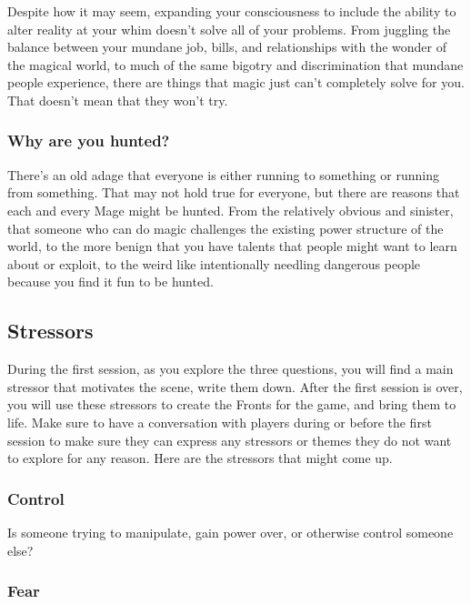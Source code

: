 \documentclass[
]{article}
\begin{document}
Despite how it may seem, expanding your consciousness to include the
ability to alter reality at your whim doesn't solve all of your
problems. From juggling the balance between your mundane job, bills, and
relationships with the wonder of the magical world, to much of the same
bigotry and discrimination that mundane people experience, there are
things that magic just can't completely solve for you. That doesn't mean
that they won't try.

\hypertarget{why-are-you-hunted}{%
\subsubsection{Why are you hunted?}\label{why-are-you-hunted}}

There's an old adage that everyone is either running to something or
running from something. That may not hold true for everyone, but there
are reasons that each and every Mage might be hunted. From the
relatively obvious and sinister, that someone who can do magic
challenges the existing power structure of the world, to the more benign
that you have talents that people might want to learn about or exploit,
to the weird like intentionally needling dangerous people because you
find it fun to be hunted.

\hypertarget{stressors}{%
\subsection{Stressors}\label{stressors}}

During the first session, as you explore the three questions, you will
find a main stressor that motivates the scene, write them down. After
the first session is over, you will use these stressors to create the
Fronts for the game, and bring them to life. Make sure to have a
conversation with players during or before the first session to make
sure they can express any stressors or themes they do not want to
explore for any reason. Here are the stressors that might come up.

\hypertarget{control}{%
\subsubsection{Control}\label{control}}

Is someone trying to manipulate, gain power over, or otherwise control
someone else?

\hypertarget{fear}{%
\subsubsection{Fear}\label{fear}}
\end{document}
